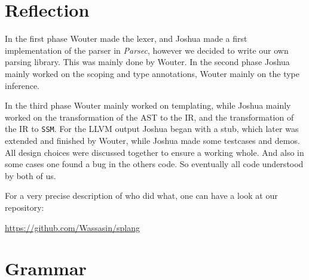 \documentclass[11pt]{amsart}
\newcommand{\llvm}{\textsc{LLVM}\xspace}
\newcommand{\ssm}{\texttt{SSM}\xspace}
\begin{document}
\section{Reflection}
In the first phase Wouter made the lexer, and Joshua made a first implementation of the parser in \emph{Parsec}, however we decided to write our own parsing library. This was mainly done by Wouter. In the second phase Joshua mainly worked on the scoping and type annotations, Wouter mainly on the type inference.

In the third phase Wouter mainly worked on templating, while Joshua mainly worked on the transformation of the AST to the IR, and the transformation of the IR to \ssm. For the \llvm output Joshua began with a stub, which later was extended and finished by Wouter, while Joshua made some testcases and demos. All design choices were discussed together to ensure a working whole. And also in some cases one found a bug in the others code. So eventually all code understood by both of us.

For a very precise description of who did what, one can have a look at our repository:

\url{https://github.com/Wassasin/splang}

\newpage
\appendix
\section{Grammar}

\newcommand{\tok}[1]{`\texttt{#1}'}
\newcommand{\I}{\hspace{0.1cm}$\mid$\hspace{0.2cm}}
\end{document}
